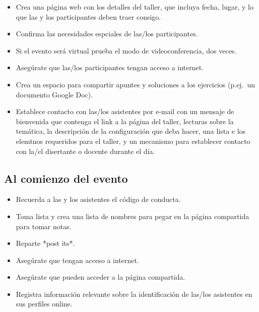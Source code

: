 \begin{itemize}

\item
  Crea una página web con los detalles del taller,
  que incluya fecha,
  lugar,
  y lo que las y los participantes deben traer consigo.

\item
  Confirma las necesidades espciales de las/los participantes.

\item
  Si el evento será virtual prueba el modo de videoconferencia, dos veces.

\item
  Asegúrate que las/los participantes tengan acceso a internet.

\item
  Crea un espacio para compartir apuntes y soluciones a los ejercicios (p.ej.\ un documento Google Doc).

\item
  Establece contacto con las/los asistentes por e-mail con un mensaje de bienvenida que contenga
  el link a la página del taller,
  lecturas sobre la temática,
  la descripción de la configuración que deba hacer,
  una lista e los elemtnos requeridos para el taller,
  y un mecanismo para establecer contacto con la/el disertante o docente durante el día.

\end{itemize}

\subsection*{Al comienzo del evento}

\begin{itemize}

\item
  Recuerda a las y los asistentes el código de conducta.

\item
  Toma lista
  y crea una lista de nombres para pegar en la página compartida para tomar notas.

\item
  Reparte *post its*.

\item
  Asegúrate que tengan acceso a internet.
  
\item
  Asegúrate que pueden acceder a la página compartida.

\item
  Registra información relevante sobre la identificación de las/los asistentes en sus perfiles online.

\end{itemize}

